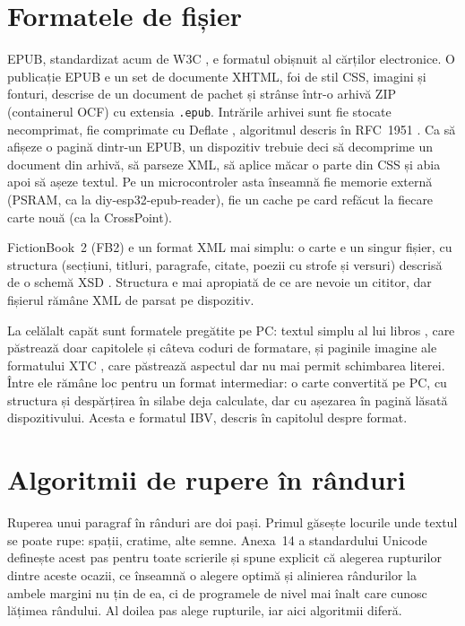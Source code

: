 \section{Formatele de fișier}
\label{sec:stadiu-formate}

EPUB, standardizat acum de W3C \citep{epub33}, e formatul obișnuit al cărților
electronice. O publicație EPUB e un set de documente XHTML, foi de stil CSS,
imagini și fonturi, descrise de un document de pachet și strânse într-o arhivă
ZIP (containerul OCF) cu extensia \texttt{.epub}. Intrările arhivei sunt fie
stocate necomprimat, fie comprimate cu Deflate \citep{epub33}, algoritmul
descris în RFC~1951 \citep{rfc1951}. Ca să afișeze o pagină dintr-un EPUB,
un dispozitiv trebuie deci să decomprime un document din arhivă, să parseze
XML, să aplice măcar o parte din CSS și abia apoi să așeze textul. Pe un
microcontroler asta înseamnă fie memorie externă (PSRAM, ca la
diy-esp32-epub-reader), fie un cache pe card refăcut la fiecare carte nouă
(ca la CrossPoint).

FictionBook~2 (FB2) e un format XML mai simplu: o carte e un singur fișier,
cu structura (secțiuni, titluri, paragrafe, citate, poezii cu strofe și
versuri) descrisă de o schemă XSD \citep{fb2}. Structura e mai apropiată de ce are
nevoie un cititor, dar fișierul rămâne XML de parsat pe dispozitiv.

La celălalt capăt sunt formatele pregătite pe PC: textul simplu al lui libros
\citep{openbook}, care păstrează doar capitolele și câteva coduri de formatare, și paginile imagine ale
formatului XTC \citep{crosspoint}, care păstrează aspectul dar nu mai permit
schimbarea literei. Între ele rămâne loc pentru un format intermediar: o carte
convertită pe PC, cu structura și despărțirea în silabe deja calculate, dar
cu așezarea în pagină lăsată dispozitivului. Acesta e formatul IBV, descris în
capitolul despre format.

\section{Algoritmii de rupere în rânduri}
\label{sec:stadiu-rupere}

Ruperea unui paragraf în rânduri are doi pași. Primul găsește locurile unde
textul se poate rupe: spații, cratime, alte semne. Anexa~14 a standardului
Unicode \citep{uax14} definește acest pas pentru toate scrierile și spune
explicit că alegerea rupturilor dintre aceste ocazii, ce înseamnă o alegere
optimă și alinierea rândurilor la ambele margini nu țin de ea, ci de
programele de nivel mai înalt care cunosc lățimea rândului. Al doilea pas
alege rupturile, iar aici algoritmii diferă.

